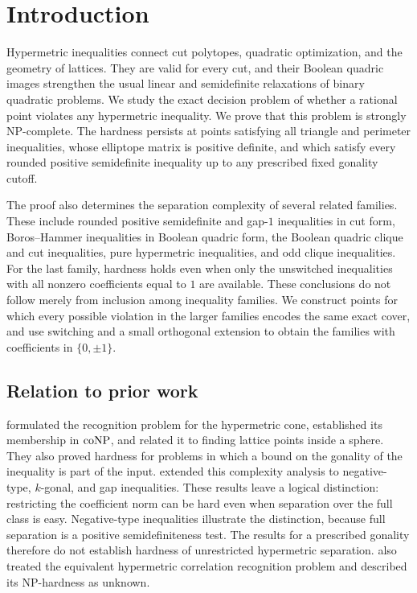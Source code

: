 \section{Introduction}\label{sec:introduction}

Hypermetric inequalities connect cut polytopes, quadratic optimization,
and the geometry of lattices.  They are valid for every cut, and their
Boolean quadric images strengthen the usual linear and semidefinite
relaxations of binary quadratic problems.  We study the exact decision
problem of whether a rational point violates any hypermetric
inequality.  We prove that this problem is strongly NP-complete.
The hardness persists at points satisfying all triangle and perimeter
inequalities, whose elliptope matrix is positive definite, and which
satisfy every rounded positive semidefinite inequality up to any
prescribed fixed gonality cutoff.

The proof also determines the separation complexity of several related
families.  These include rounded positive semidefinite and gap-$1$
inequalities in cut form, Boros--Hammer inequalities in Boolean quadric
form, the Boolean quadric clique and cut inequalities, pure hypermetric
inequalities, and odd clique inequalities.  For the last family,
hardness holds even when only the unswitched inequalities with all
nonzero coefficients equal to $1$ are available.  These conclusions do
not follow merely from inclusion among inequality families.  We
construct points for which every possible violation in the larger
families encodes the same exact cover, and use switching and a small
orthogonal extension to obtain the families with coefficients in
$\{0,\pm1\}$.

\subsection{Relation to prior work}

\citet{AvisGrishukhin1993} formulated the recognition problem for the
hypermetric cone, established its membership in $\mathrm{coNP}$, and related it
to finding lattice points inside a sphere.  They also proved hardness
for problems in which a bound on the gonality of the inequality is part
of the input.  \citet{Avis2003} extended this complexity analysis to
negative-type, $k$-gonal, and gap inequalities.  These results leave a
logical distinction: restricting the coefficient norm can be hard even
when separation over the full class is easy.  Negative-type
inequalities illustrate the distinction, because full separation is a
positive semidefiniteness test.  The results for a prescribed gonality
therefore do not establish hardness of unrestricted hypermetric
separation.  \citet{DezaGrishukhin1997} also treated the equivalent
hypermetric correlation recognition problem and described its
NP-hardness as unknown.

